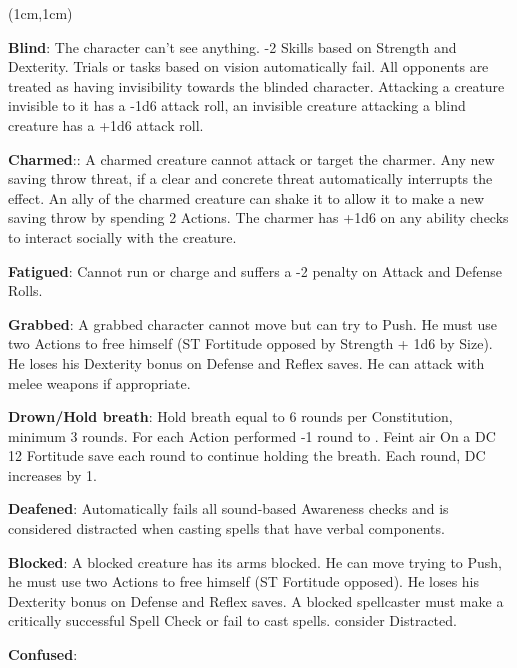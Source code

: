 \documentclass[a4paper,12 pt,openany]{book}
\begin{document}
\center

\footnotesize

\begin{textblock*}{19 cm}(1cm,1cm) %
\flushleft

\begin{multicols}{2}

\textbf{Blind}: The character can't see anything. -2 Skills based on Strength and Dexterity. Trials or tasks based on vision automatically fail. All opponents are treated as having invisibility towards the blinded character. Attacking a creature invisible to it has a -1d6 attack roll, an invisible creature attacking a blind creature has a +1d6 attack roll.

\textbf{Charmed}:: A charmed creature cannot attack or target the charmer. Any new saving throw threat, if a clear and concrete threat automatically interrupts the effect. An ally of the charmed creature can shake it to allow it to make a new saving throw by spending 2 Actions. The charmer has +1d6 on any ability checks to interact socially with the creature.

\textbf{Fatigued}: Cannot run or charge and suffers a -2 penalty on Attack and Defense Rolls.

\textbf{Grabbed}: A grabbed character cannot move but can try to Push. He must use two Actions to free himself (ST Fortitude opposed by Strength + 1d6 by Size). He loses his Dexterity bonus on Defense and Reflex saves. He can attack with melee weapons if appropriate.

\textbf{Drown/Hold breath}:  Hold breath equal to 6 rounds per Constitution, minimum 3 rounds. For each Action performed -1 round to . Feint air On a DC 12 Fortitude save each round to continue holding the breath. Each round, DC increases by 1.

\textbf{Deafened}: Automatically fails all sound-based Awareness checks and is considered distracted when casting spells that have verbal components.

\textbf{Blocked}: A blocked creature has its arms blocked. He can move trying to Push, he must use two Actions to free himself (ST Fortitude opposed). He loses his Dexterity bonus on Defense and Reflex saves. A blocked spellcaster must make a critically successful Spell Check or fail to cast spells. consider Distracted.

\textbf{Confused}: 


\end{multicols}
\end{textblock*}
\end{document}

